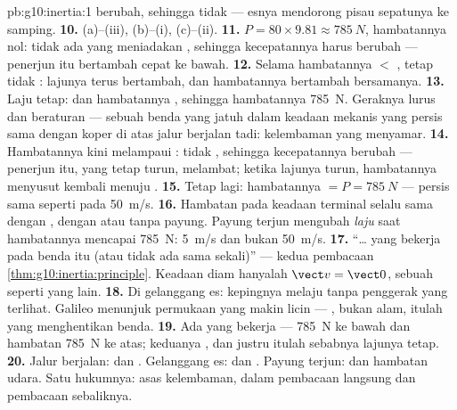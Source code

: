 \begin{solution}{pb:g10:inertia:1}
berubah, sehingga  tidak  --- esnya mendorong
pisau sepatunya ke samping.
\textbf{10.} (a)--(iii), (b)--(i), (c)--(ii).
\textbf{11.}  $P = 80 \times 9.81 \approx \qty{785}{N}$,
hambatannya nol: tidak ada yang meniadakan , sehingga
kecepatannya harus berubah --- penerjun itu bertambah cepat ke bawah.
\textbf{12.} Selama hambatannya $<$ ,  tetap tidak
: lajunya terus bertambah, dan hambatannya bertambah
bersamanya.
\textbf{13.} Laju tetap:  dan hambatannya ,
sehingga hambatannya \qty{785}{N}. Geraknya lurus dan beraturan ---
sebuah benda yang jatuh dalam keadaan mekanis yang persis sama dengan
koper di atas jalur berjalan tadi: kelembaman yang menyamar.
\textbf{14.} Hambatannya kini melampaui :  tidak , sehingga kecepatannya berubah --- penerjun itu, yang tetap
turun, melambat; ketika lajunya turun, hambatannya menyusut kembali
menuju .
\textbf{15.} Tetap lagi: hambatannya $= P = \qty{785}{N}$ --- persis
sama seperti pada \qty{50}{m/s}.
\textbf{16.} Hambatan pada keadaan terminal selalu sama dengan
, dengan atau tanpa payung. Payung terjun mengubah \emph{laju}
saat hambatannya mencapai \qty{785}{N}: \qty{5}{m/s} dan bukan
\qty{50}{m/s}.
\textbf{17.} ``\dots {} yang bekerja pada benda itu 
(atau tidak ada  sama sekali)'' --- kedua pembacaan
\cref{thm:g10:inertia:principle}. Keadaan diam hanyalah
$\vect v = \vect 0$, sebuah  seperti yang lain.
\textbf{18.} Di gelanggang es: kepingnya melaju tanpa penggerak yang
terlihat. Galileo menunjuk permukaan yang makin licin --- , bukan
alam, itulah yang menghentikan benda.
\textbf{19.} Ada  yang bekerja ---  \qty{785}{N} ke bawah dan
hambatan \qty{785}{N} ke atas; keduanya \emph{}, dan
justru itulah sebabnya lajunya tetap.
\textbf{20.} Jalur berjalan:  dan . Gelanggang es:
 dan . Payung terjun:  dan hambatan udara. Satu
hukumnya: asas kelembaman, dalam pembacaan langsung dan pembacaan
sebaliknya.
\end{solution}
